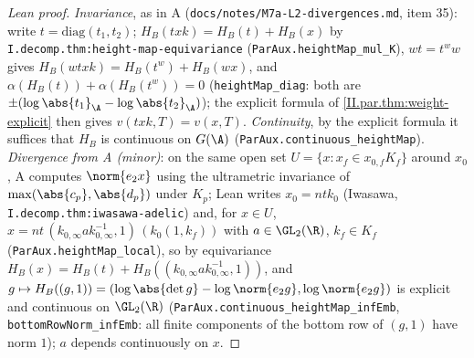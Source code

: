 \begin{proof}[Lean proof]
\emph{Invariance}, as in A (\texttt{docs/notes/M7a-L2-divergences.md}, item 35): write $t=\mathrm{diag}(t_1,t_2)$; $H_B(txk)=H_B(t)+H_B(x)$ by \texttt{I.decomp.thm:height-map-equivariance} (\texttt{ParAux.heightMap\_mul\_K}), $wt=t^ww$ gives $H_B(wtxk)=H_B(t^w)+H_B(wx)$, and $\alpha(H_B(t))+\alpha(H_B(t^w))=0$ (\texttt{heightMap\_diag}: both are $\pm(\log\abs{t_1}_\A-\log\abs{t_2}_\A)$); the explicit formula of \cref{II.par.thm:weight-explicit} then gives $v(txk,T)=v(x,T)$. \emph{Continuity}, by the explicit formula it suffices that $H_B$ is continuous on $G(\A)$ (\texttt{ParAux.continuous\_heightMap}). \emph{Divergence from A (minor)}: on the same open set $U=\{x:x_f\in x_{0,f}K_f\}$ around $x_0$, A computes $\norm{e_2x}$ using the ultrametric invariance of $\max(\abs{c_p},\abs{d_p})$ under $K_p$; Lean writes $x_0=ntk_0$ (Iwasawa, \texttt{I.decomp.thm:iwasawa-adelic}) and, for $x\in U$, $x=nt\,(k_{0,\infty}ak_{0,\infty}^{-1},1)\,(k_0(1,k_f))$ with $a\in\GL_2(\R)$, $k_f\in K_f$ (\texttt{ParAux.heightMap\_local}), so by equivariance $H_B(x)=H_B(t)+H_B((k_{0,\infty}ak_{0,\infty}^{-1},1))$, and $g\mapsto H_B((g,1))=(\log\abs{\det g}-\log\norm{e_2g},\log\norm{e_2g})$ is explicit and continuous on $\GL_2(\R)$ (\texttt{ParAux.continuous\_heightMap\_infEmb}, \texttt{bottomRowNorm\_infEmb}: all finite components of the bottom row of $(g,1)$ have norm $1$); $a$ depends continuously on $x$.
\end{proof}
